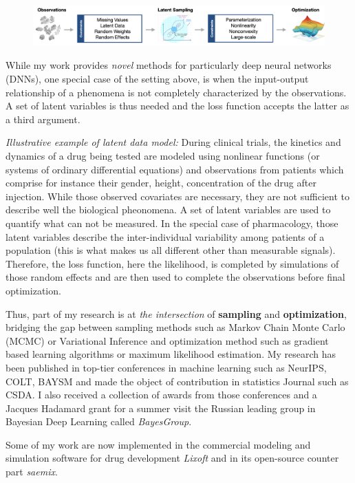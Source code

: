 \documentclass[twoside,11pt]{article}
\begin{document}
\begin{figure}[h]
\centering
\includegraphics[width=\textwidth]{fig}
\end{figure}

While my work provides \emph{novel} methods for particularly deep neural networks (DNNs), one special case of the setting above, is when the input-output relationship of a phenomena is not completely characterized by the observations.
A set of latent variables is thus needed and the loss function accepts the latter as a third argument.

\textit{ Illustrative example of latent data model:} 
During clinical trials, the kinetics and dynamics of a drug being tested are modeled using nonlinear functions (or systems of ordinary differential equations) and observations from patients which comprise for instance their gender, height, concentration of the drug after injection.
While those observed covariates are necessary, they are not sufficient to describe well the biological pheonomena. 
A set of latent variables are used to quantify what can not be measured. 
In the special case of pharmacology, those latent variables describe the inter-individual variability among patients of a population (this is what makes us all different other than measurable signals). 
Therefore, the loss function, here the likelihood, is completed by simulations of those random effects and are then used to complete the observations before final optimization.

Thus, part of my research is at \emph{the intersection} of \textbf{sampling} and \textbf{optimization}, bridging the gap between sampling methods such as Markov Chain Monte Carlo (MCMC) or Variational Inference and optimization method such as gradient based learning algorithms or maximum likelihood estimation.
My research has been published in top-tier conferences in machine learning such as NeurIPS, COLT, BAYSM and made the object of contribution in statistics Journal such as CSDA. I also received a collection of awards from those conferences and a Jacques Hadamard grant for a summer visit the Russian leading group in Bayesian Deep Learning called \emph{BayesGroup}.

Some of my work are now implemented in the commercial modeling and simulation software for drug development \emph{Lixoft} and in its open-source counter part \emph{saemix}.
\end{document}
